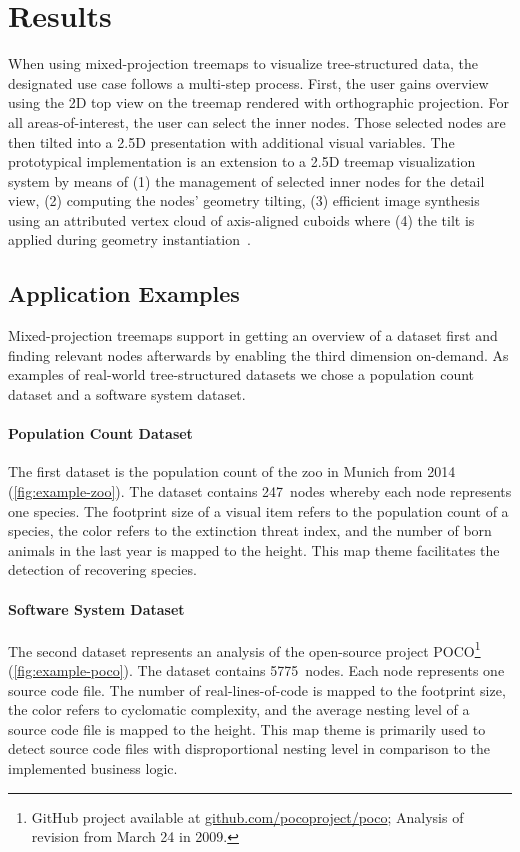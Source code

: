 
\section{Results}
\label{sec:results}

\noindent
When using mixed-projection treemaps to visualize tree-structured data, the designated use case follows a multi-step process.
First, the user gains overview using the 2D top view on the treemap rendered with orthographic projection.
For all areas-of-interest, the user can select the inner nodes.
Those selected nodes are then tilted into a 2.5D presentation with additional visual variables.
The prototypical implementation is an extension to a 2.5D treemap visualization system by means of
(1) the management of selected inner nodes for the detail view,
(2) computing the nodes' geometry tilting,
(3) efficient image synthesis using an attributed vertex cloud of axis-aligned cuboids where
(4) the tilt is applied during geometry instantiation~\cite{Scheibel2017}.

\subsection*{Application Examples}

\noindent
Mixed-projection treemaps support in getting an overview of a dataset first and finding relevant nodes afterwards by enabling the third dimension on-demand.
As examples of real-world tree-structured datasets we chose a population count dataset and a software system dataset.

\paragraph{Population Count Dataset}
The first dataset is the population count of the zoo in Munich from 2014 (\autoref{fig:example-zoo}).
The dataset contains 247~nodes whereby each node represents one species.
The footprint size of a visual item refers to the population count of a species, the color refers to the extinction threat index, and the number of born animals in the last year is mapped to the height.
This map theme facilitates the detection of recovering species.

\paragraph{Software System Dataset}
The second dataset represents an analysis of the open-source project POCO\footnote{GitHub project available at \url{github.com/pocoproject/poco}; Analysis of revision from March 24 in 2009.} (\autoref{fig:example-poco}).
The dataset contains 5775~nodes.
Each node represents one source code file.
The number of real-lines-of-code is mapped to the footprint size, the color refers to cyclomatic complexity, and the average nesting level of a source code file is mapped to the height.
This map theme is primarily used to detect source code files with disproportional nesting level in comparison to the implemented business logic.

